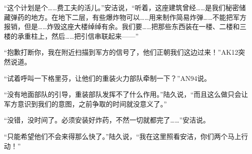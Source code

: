 “这个计划是个……费工夫的活儿。”安洁说，“听着，这座建筑曾经……是我们秘密储藏弹药的地方。在地下二层，有些爆炸物可以……用来制作简易炸弹……不能把军方报销，但是……炸毁这座大楼绰绰有余。我们要……把那些东西装在一楼、二楼和三楼的承重柱上，然后……把引信串联起来——”

“抱歉打断你，我在附近扫描到军方的信号了，他们正朝我们这边过来！”AK12突然说道。

“试着呼叫一下格里芬，让他们的重装火力部队牵制一下？”AN94说。

“没有地面部队的引导，重装部队发挥不了什么作用。”陆久说，“而且这么做只会让军方意识到我们的意图，之前争取的时间就没意义了。”

“没错，没时间了。必须安装好炸药，不然一切就都完了……”安洁说。

“只能希望他们不会来得那么快了。”陆久说，“我在这里照看安洁，你们两个马上行动！”


